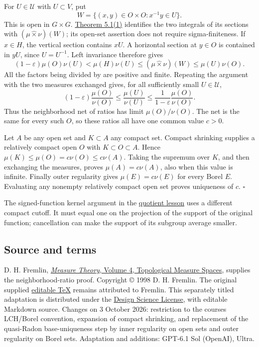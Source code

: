 \documentclass[
  english,
  11pt,
  a4paper,
]{article}
\newcounter{none} %
\begin{document}
For \(U\in\mathcal U\) with \(U\subset V\), put
\[W=\{(x,y)\in O\times O:x^{-1}y\in U\}.\] This is open in
\(G\times G\).
\hyperlink{haar-measure-on-locally-compact-groups--oa-fnd-hm-10}{Theorem
5.1(1)} identifies the two integrals of its sections with
\((\mu\widehat\times\nu)(W)\); its open-set assertion does not require
sigma-finiteness. If \(x\in H\), the vertical section contains \(xU\). A
horizontal section at \(y\in O\) is contained in \(yU\), since
\(U=U^{-1}\). Left invariance therefore gives
\[(1-\varepsilon)\mu(O)\nu(U)
<\mu(H)\nu(U)
\le (\mu\widehat\times\nu)(W)
\le\mu(U)\nu(O).\] All the factors being divided by are positive and
finite. Repeating the argument with the two measures exchanged gives,
for all sufficiently small \(U\in\mathcal U\),
\[(1-\varepsilon)\frac{\mu(O)}{\nu(O)}
\le\frac{\mu(U)}{\nu(U)}
\le\frac1{1-\varepsilon}\frac{\mu(O)}{\nu(O)}.\] Thus the neighborhood
net of ratios has limit \(\mu(O)/\nu(O)\). The net is the same for every
such \(O\), so these ratios all have one common value \(c>0\).

Let \(A\) be any open set and \(K\subset A\) any compact set. Compact
shrinking supplies a relatively compact open \(O\) with
\(K\subset O\subset A\). Hence \(\mu(K)\le\mu(O)=c\nu(O)\le c\nu(A)\).
Taking the supremum over \(K\), and then exchanging the measures, proves
\(\mu(A)=c\nu(A)\), also when this value is infinite. Finally outer
regularity gives \(\mu(E)=c\nu(E)\) for every Borel \(E\). Evaluating
any nonempty relatively compact open set proves uniqueness of \(c\).
\(\square\)

The signed-function kernel argument in the
\hyperref[quotient-measures-and-weils-integration-formula--exactly-when-the-quotient-measure-is-invariant]{quotient
lesson} uses a different compact cutoff. It must equal one on the
projection of the support of the original function; cancellation can
make the support of its subgroup average smaller.

\subsection{Source and
terms}\label{fremlin-neighbourhood-uniqueness--source-and-terms}

D. H. Fremlin,
\href{https://www1.essex.ac.uk/maths/people/fremlin/mt4.2013/index.htm}{\emph{Measure
Theory}, Volume 4, Topological Measure Spaces}, supplies the
neighborhood-ratio proof. Copyright © 1998 D. H. Fremlin. The original
supplied
\href{https://www1.essex.ac.uk/maths/people/fremlin/mt4.2013/mt442.tex}{editable
TeX} remains attributed to Fremlin. This separately titled adaptation is
distributed under the \hyperref[design-science-licence]{Design Science
License}, with editable Markdown source. Changes on 3 October 2026:
restriction to the course\textquotesingle s LCH/Borel convention,
expansion of compact shrinking, and replacement of the quasi-Radon
base-uniqueness step by inner regularity on open sets and outer
regularity on Borel sets. Adaptation and additions: GPT-6.1 Sol
(OpenAI), Ultra.
\end{document}
